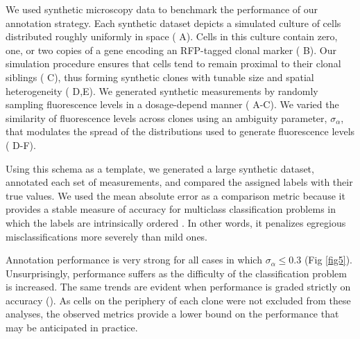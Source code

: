 \documentclass[10pt,letterpaper]{article}
\begin{document}
We used synthetic microscopy data to benchmark the performance of our annotation strategy. Each synthetic dataset depicts a simulated culture of cells distributed roughly uniformly in space ( A). Cells in this culture contain zero, one, or two copies of a gene encoding an RFP-tagged clonal marker ( B). Our simulation procedure ensures that cells tend to remain proximal to their clonal siblings ( C), thus forming synthetic clones with tunable size and spatial heterogeneity ( D,E). We generated synthetic measurements by randomly sampling fluorescence levels in a dosage-depend manner ( A-C). We varied the similarity of fluorescence levels across clones using an ambiguity parameter, $\sigma_{\alpha}$, that modulates the spread of the distributions used to generate fluorescence levels ( D-F). 

Using this schema as a template, we generated a large synthetic dataset, annotated each set of measurements, and compared the assigned labels with their true values. We used the mean absolute error as a comparison metric because it provides a stable measure of accuracy for multiclass classification problems in which the labels are intrinsically ordered \cite{Gaudette2009}. In other words, it penalizes egregious misclassifications more severely than mild ones.

Annotation performance is very strong for all cases in which $\sigma_{\alpha} \leq 0.3$ (Fig \ref{fig5}). Unsurprisingly, performance suffers as the difficulty of the classification problem is increased. The same trends are evident when performance is graded strictly on accuracy (). As cells on the periphery of each clone were not excluded from these analyses, the observed metrics provide a lower bound on the performance that may be anticipated in practice.
\end{document}

